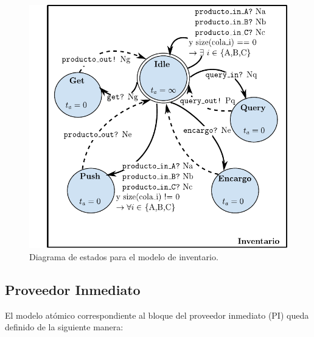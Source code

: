 \documentclass[10pt]{article}
\begin{document}
\begin{figure}[htbp]
	\centering
	\includegraphics{img/Inventariodevsgraph}
	\caption{Diagrama de estados para el modelo de inventario.}
	\label{fig:I-estados}
\end{figure}


\subsection{Proveedor Inmediato\label{sec:PI}}
El modelo atómico correspondiente al bloque del proveedor inmediato (PI) queda definido de la siguiente manera:

\\
\end{document}
